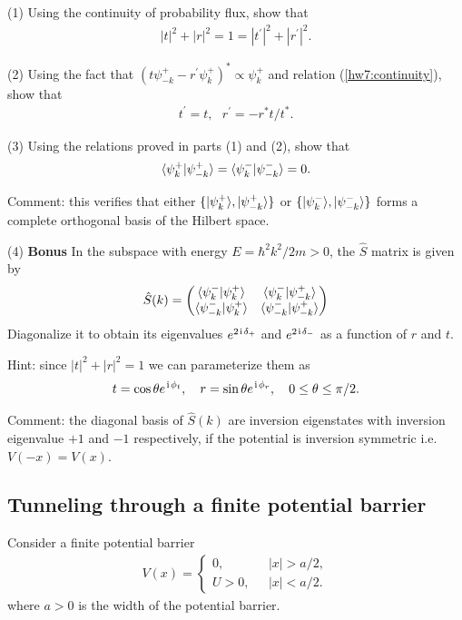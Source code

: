 (1) Using the continuity of probability flux, show that
\begin{align}\label{hw7:continuity}
|t|^2+|r|^2=1=|t^\prime|^2+|r^\prime|^2.
\end{align}

(2) Using the fact that $(t\psi^+_{-k}-r^\prime\psi_k^+)^\ast\propto\psi_k^+$ and relation (\ref{hw7:continuity}), show that
\begin{align}
t^\prime=t,~~~r^\prime=-r^\ast t/t^\ast.
\end{align}

(3) Using the relations proved in parts (1) and (2), show that 
\begin{align}
\langle{\psi_k^+|\psi^+_{-k}}\rangle=\langle{\psi_k^-|\psi^-_{-k}}\rangle=0.
\end{align}

Comment: this verifies that either $\{|{\psi_k^+}\rangle,|{\psi_{-k}^+}\rangle\}$ or $\{|{\psi_k^-}\rangle,|{\psi_{-k}^-}\rangle\}$ forms a complete orthogonal basis of the Hilbert space. 

(4) \textbf{Bonus} In the subspace with energy $E=\hbar^2k^2/2m>0$, the $\hat S$ matrix is given by
\begin{align}
\hat S(k)=\begin{pmatrix}\langle{\psi^-_{k}|\psi^+_{k}}\rangle&\langle{\psi^-_{k}|\psi^+_{-k}}\rangle\\ \langle{\psi^-_{-k}|\psi^+_{k}}\rangle&\langle{\psi^-_{-k}|\psi^+_{-k}}\rangle\end{pmatrix}
\end{align}
Diagonalize it to obtain its eigenvalues $e^{2\hspace{1pt}\mathrm{i}\hspace{1pt}\delta_+}$ and $e^{2\hspace{1pt}\mathrm{i}\hspace{1pt}\delta_-}$ as a function of $r$ and $t$. 

Hint: since $|t|^2+|r|^2=1$ we can parameterize them as
\begin{align}
t=\cos\theta e^{\hspace{1pt}\mathrm{i}\hspace{1pt}\phi_t},~~~r=\sin\theta e^{\hspace{1pt}\mathrm{i}\hspace{1pt}\phi_r},~~~0\leq\theta\leq\pi/2.
\end{align}

Comment: the diagonal basis of $\hat S(k)$ are inversion eigenstates with inversion eigenvalue $+1$ and $-1$ respectively, if the potential is inversion symmetric i.e. $V(-x)=V(x)$. 

\subsection{Tunneling through a finite potential barrier}

Consider a finite potential barrier
\begin{align}
V(x)=\begin{cases}
    0,~~~&|x|>a/2,\\
    U>0,~~~&|x|<a/2.
\end{cases}
\end{align}
where $a>0$ is the width of the potential barrier. 

